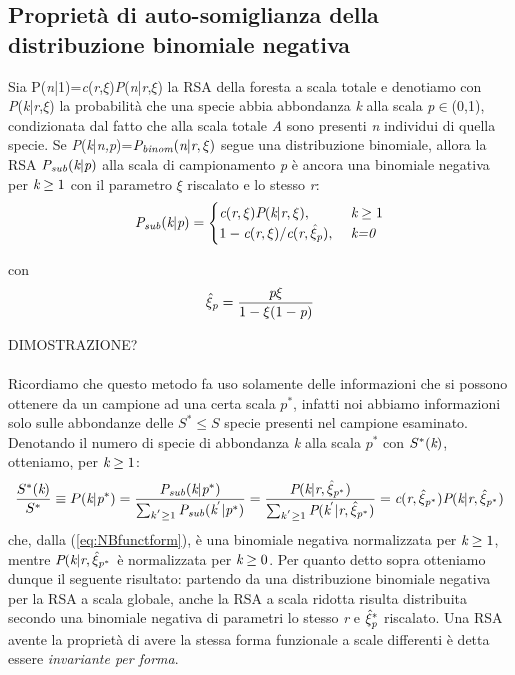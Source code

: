 \subsection{Proprietà di auto-somiglianza della distribuzione binomiale negativa}
Sia P(\emph{n}|1)=\emph{c}(\emph{r},$\xi$)\emph{P}(\emph{n}|\emph{r},$\xi$) la RSA della foresta a scala totale e denotiamo con \emph{P}(\emph{k}|\emph{r},$\xi$) la probabilità che una specie abbia abbondanza \emph{k} alla scala \emph{p}$\in$(0,1), condizionata dal fatto che alla scala totale \emph{A} sono presenti \emph{n} individui di quella specie.
Se \emph{P}(\emph{k}|\emph{n,p})=$\emph{P}_\emph{binom}(\emph{n}|\emph{r},\xi)$ segue una distribuzione binomiale, allora la RSA $\emph{P}_\emph{sub}(\emph{k}|\emph{p})$ alla scala di campionamento \emph{p} è ancora una binomiale negativa per $\emph{k}\ge1$ con il parametro $\xi$ riscalato e lo stesso \emph{r}:
\begin{equation}
    \emph{P}_\emph{sub}(\emph{k}|\emph{p})=\begin{cases} \emph{c}(\emph{r},\xi)\emph{P}(\emph{k}|\emph{r},\xi), & \mbox{ }\emph{k}\ge1 \\ 1-\emph{c}(\emph{r},\xi)/\emph{c}(\emph{r},\hat\xi_{\emph{p}}), & \mbox{ }\mbox{\emph{k=0}}
    \end{cases}
\label{eq:RSAbinom}
\end{equation}

con 
\begin{equation}
    \hat\xi_{\emph{p}}=\frac{\emph{p}\xi}{1-\xi(1-\emph{p})}
\label{eq:NBparametersub}
\end{equation}

DIMOSTRAZIONE?\\
\\
Ricordiamo che questo metodo fa uso solamente delle informazioni che si possono ottenere da un campione ad una certa scala $p^*$, infatti noi abbiamo informazioni solo sulle abbondanze delle $S^*\le S$ specie presenti nel campione esaminato. Denotando il numero di specie di abbondanza \emph{k} alla scala $p^*$ con $S^*(\emph{k})$, otteniamo, per $\emph{k}\ge 1$:
\begin{equation}
    \frac{S^*(\emph{k})}{S^*}\equiv P(\emph{k}|\emph{p}^*)=\frac{\emph{P}_\emph{sub}(\emph{k}|\emph{p}^*)}{\sum_{k^{'} \ge 1}^{} \emph{P}_\emph{sub}(\emph{k}^{'}|\emph{p}^{*})}
    =\frac{\emph{P}(\emph{k}|\emph{r},\hat\xi_{\emph{p}^*})}{\sum_{k^{'} \ge 1}^{} \emph{P}(\emph{k}^{'}|\emph{r},\hat \xi_{\emph{p}^*})}
    =\emph{c}(\emph{r},\hat\xi_{\emph{p}^*})\emph{P}(\emph{k}|\emph{r},\hat \xi_{\emph{p}^*})
\end{equation}
che, dalla (\ref{eq:NBfunctform}), è una binomiale negativa normalizzata per $\emph{k}\ge 1$, mentre $\emph{P}(\emph{k}|\emph{r},\hat \xi_{\emph{p}^*}$ è normalizzata per $\emph{k}\ge 0$.
Per quanto detto sopra otteniamo dunque il seguente risultato: partendo da una distribuzione binomiale negativa per la RSA a scala globale, anche la RSA a scala ridotta risulta distribuita secondo una binomiale negativa di parametri lo stesso \emph{r} e $\hat \xi_\emph{p}^*$ riscalato.
Una RSA avente la proprietà di avere la stessa forma funzionale a scale differenti è detta essere \emph{invariante per forma}.

